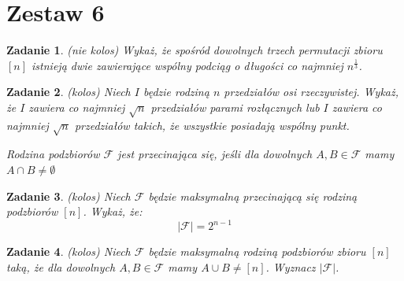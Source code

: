 \documentclass{mwart}
\newtheorem{zad}{Zadanie}[section]
\begin{document}
\newpage
\section{Zestaw 6}          %

\begin{zad}(nie kolos)
    Wykaż, że spośród dowolnych trzech permutacji zbioru $[n]$
    istnieją dwie zawierające wspólny podciąg o długości co najmniej $n^{\frac{1}{3}}$.
\end{zad}
\begin{mdframed}

\end{mdframed}
\begin{mdframed}

\end{mdframed}


\begin{zad}(kolos)
    Niech $I$ będzie rodziną $n$ przedziałów osi rzeczywistej.
    Wykaż, że $I$ zawiera co najmniej $\sqrt{n}$ przedziałów
    parami rozłącznych lub $I$ zawiera co najmniej $\sqrt{n}$
    przedziałów takich, że wszystkie posiadają wspólny punkt.

    Rodzina podzbiorów $\mathcal{F}$ jest przecinająca się, jeśli
    dla dowolnych $A, B \in \mathcal{F}$ mamy $A \cap B \neq \emptyset$
\end{zad}
\begin{mdframed}

\end{mdframed}
\begin{mdframed}

\end{mdframed}


\begin{zad}(kolos)
    Niech $\mathcal{F}$ będzie maksymalną przecinającą się rodziną podzbiorów $[n]$.
    Wykaż, że:
    \[ |\mathcal{F}| = 2^{n-1} \]
\end{zad}
\begin{mdframed}

\end{mdframed}
\begin{mdframed}

\end{mdframed}



\begin{zad}(kolos)
    Niech $\mathcal{F}$ będzie maksymalną rodziną podzbiorów zbioru $[n]$ taką,
    że dla dowolnych $A, B \in \mathcal{F}$ mamy $A \cup B \neq [n]$. Wyznacz $|\mathcal{F}|$.
\end{zad}
\begin{mdframed}

\end{mdframed}
\begin{mdframed}

\end{mdframed}
\end{document}
